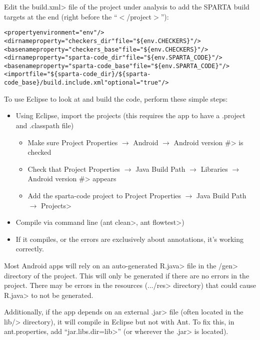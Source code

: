 Edit the \<build.xml> file of the project under analysis to add the
SPARTA build targets at the end (right before the ``$<$/project$>$''):

\begin{alltt}
<property environment="env"/>
<dirname property="checkers_dir" file="\$\{env.CHECKERS\}"/>
<basename property="checkers_base" file="\$\{env.CHECKERS\}"/>
<dirname property="sparta-code_dir" file="\$\{env.SPARTA_CODE\}"/>
<basename property="sparta-code_base" file="\$\{env.SPARTA_CODE\}"/>
<import file="\$\{sparta-code_dir\}/\$\{sparta-code_base\}/build.include.xml" optional="true"/>
\end{alltt}



To use Eclipse to look at and build the code, perform these simple
steps:
\begin{itemize}
\item
Using Eclipse, import the projects (this requires the app to have a
.project and .classpath file)
  \begin{itemize}
    \item
    Make sure
    \<Project Properties $\rightarrow$ Android $\rightarrow$ Android
    version \#> is checked

    \item
    Check that
    \<Project Properties $\rightarrow$ Java Build Path $\rightarrow$
    Libraries $\rightarrow$ Android version \#> appears

    \item
    Add the sparta-code project to
    \<Project Properties $\rightarrow$ Java Build Path $\rightarrow$ Projects>
    
  \end{itemize}

\item Compile via command line (\<ant clean>, \<ant flowtest>)

\item If it compiles, or the errors are exclusively about annotations,
  it's working correctly.
\end{itemize}

Most Android apps will rely on an auto-generated \<R.java> file
in the \</gen> directory of the project. This will only be generated
if there are no errors in the project. There may be errors in the
resources (\<.../res> directory) that could cause \<R.java> to not be
generated.

Additionally, if the app depends on an external \<.jar> file (often
located in the \<lib/> directory), it will compile in Eclipse but not
with Ant. To fix this, in ant.properties, add ``\<jar.libs.dir=lib>''
(or wherever the \<.jar> is located).


